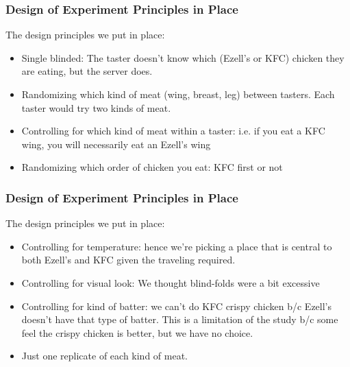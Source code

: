 \documentclass[slides]{beamer}
\newcommand{\blue}[1]{\textcolor{blue2}{#1}}
\begin{document}
\begin{frame}
\frametitle{Design of Experiment Principles in Place}

The design principles we put in place:

\vspace{0.25cm}

\begin{itemize}
\pause\item \blue{Single blinded}: The taster doesn't know which (Ezell's or KFC) chicken they are eating, but the server does.
\pause\item \blue{Randomizing} which kind of meat (wing, breast, leg) between tasters.  Each taster would try two kinds of meat.  
\pause\item \blue{Controlling for which kind of meat within a taster}:  i.e. if you eat a KFC wing, you will necessarily eat an Ezell's wing
\pause\item \blue{Randomizing} which order of chicken you eat:  KFC first or not
\end{itemize}
\end{frame}


\begin{frame}
\frametitle{Design of Experiment Principles in Place}

The design principles we put in place:

\vspace{0.25cm}

\begin{itemize}
\pause\item \blue{Controlling for temperature}: hence we're picking a place that is central to both Ezell's and KFC given the traveling required.
\pause\item \blue{Controlling for visual look}: We thought blind-folds were a bit excessive
\pause\item \blue{Controlling for kind of batter}:  we can't do KFC crispy chicken b/c Ezell's doesn't have that type of batter.  This is a limitation of the study b/c some feel the crispy chicken is better, but we have no choice.  
\pause\item Just one \blue{replicate} of each kind of meat.  
\end{itemize}
\end{frame}
\end{document}

